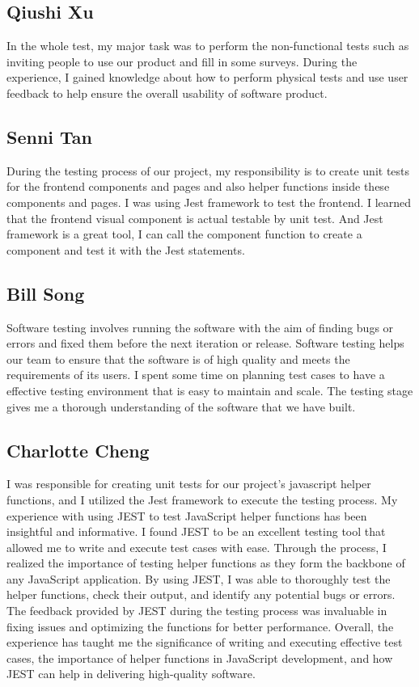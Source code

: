 \documentclass[12pt, titlepage]{article}
\begin{document}
\subsection{Qiushi Xu}
In the whole test, my major task was to perform the non-functional tests such as inviting people to use our product and fill in some surveys. During the experience, I gained knowledge about how to perform physical tests and use user feedback to help ensure the overall usability of software product.

\subsection{Senni Tan}
During the testing process of our project, my responsibility is to create unit tests for the frontend components and pages and also helper functions inside these components and pages. I was using Jest framework to test the frontend. I learned that the frontend visual component is actual testable by unit test. And Jest framework is a great tool, I can call the component function to create a component and test it with the Jest statements. 

\subsection{Bill Song}
Software testing involves running the software with the aim of finding bugs or errors and fixed them before the next iteration or release. Software testing helps our team to ensure that the software is of high quality and meets the requirements of its users. I spent some time on planning test cases to have a effective testing environment that is easy to maintain and scale. The testing stage gives me a thorough understanding of the software that we have built.

\subsection{Charlotte Cheng}
I was responsible for creating unit tests for our project's javascript helper functions, and I utilized the Jest framework to execute the testing process. My experience with using JEST to test JavaScript helper functions has been insightful and informative. I found JEST to be an excellent testing tool that allowed me to write and execute test cases with ease. Through the process, I realized the importance of testing helper functions as they form the backbone of any JavaScript application. By using JEST, I was able to thoroughly test the helper functions, check their output, and identify any potential bugs or errors. The feedback provided by JEST during the testing process was invaluable in fixing issues and optimizing the functions for better performance. Overall, the experience has taught me the significance of writing and executing effective test cases, the importance of helper functions in JavaScript development, and how JEST can help in delivering high-quality software.
\end{document}
